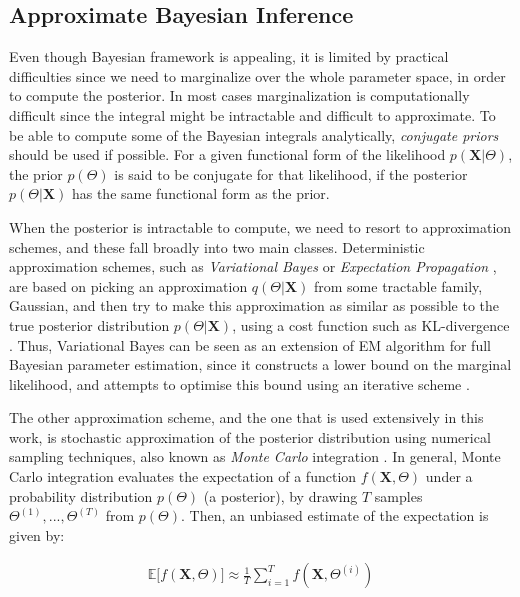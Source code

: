 \subsection{Approximate Bayesian Inference}
Even though Bayesian framework is appealing, it is limited by practical difficulties since we need to marginalize over the whole parameter space, in order to compute the posterior. In most cases marginalization is computationally difficult since the integral might be intractable and difficult to approximate. To be able to compute some of the Bayesian integrals analytically, \emph{conjugate priors} should be used if possible. For a given functional form of the likelihood $p(\mathbf{X}|\Theta)$, the prior $p(\Theta)$ is said to be conjugate for that likelihood, if the posterior $p(\Theta|\mathbf{X})$ has the same functional form as the prior.

When the posterior is intractable to compute, we need to resort to approximation schemes, and these fall broadly into two main classes. Deterministic approximation schemes, such as \emph{Variational Bayes} \citep{Beal2003} or \emph{Expectation Propagation} \citep{Minka1999}, are based on picking an approximation $q(\Theta|\mathbf{X})$ from some tractable family, \eg Gaussian, and then try to make this approximation as similar as possible to the true posterior distribution $p(\Theta|\mathbf{X})$, using a cost function such as KL-divergence \cite[Ch. 21]{Murphy2012}. Thus, Variational Bayes can be seen as an extension of EM algorithm for full Bayesian parameter estimation, since it constructs a lower bound on the marginal likelihood, and attempts to optimise this bound using an iterative scheme \citep{Beal2003}.

The other approximation scheme, and the one that is used extensively in this work, is stochastic approximation of the posterior distribution using numerical sampling techniques, also known as \emph{Monte Carlo} integration \citep{Robert1999, Liu2001}. In general, Monte Carlo integration evaluates the expectation of a function $f(\mathbf{X},\Theta)$ under a probability distribution $p(\Theta)$ (\eg a posterior), by drawing $T$ samples $\Theta^{(1)},...,\Theta^{(T)}$ from $p(\Theta)$. Then, an unbiased estimate of the expectation is given by:

\begin{equation} \label{mc-f-bayes}
  \begin{aligned}
	\mathbb{E}\big[ f(\mathbf{X}, \Theta)\big] \approx \frac{1}{T} \sum\limits_{i=1}^{T} f(\mathbf{X}, \Theta^{(i)})
  \end{aligned}
\end{equation}

